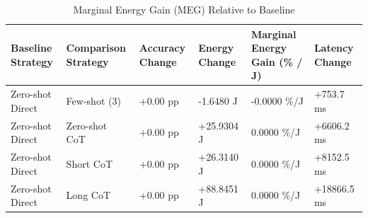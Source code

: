 \begin{table}
\caption{Marginal Energy Gain (MEG) Relative to Baseline}
\label{tab:marginal_energy_gain}
\begin{tabular}{llllll}
\toprule
Baseline Strategy & Comparison Strategy & Accuracy Change & Energy Change & Marginal Energy Gain (\% / J) & Latency Change \\
\midrule
Zero-shot Direct & Few-shot (3) & +0.00 pp & -1.6480 J & -0.0000 \%/J & +753.7 ms \\
Zero-shot Direct & Zero-shot CoT & +0.00 pp & +25.9304 J & 0.0000 \%/J & +6606.2 ms \\
Zero-shot Direct & Short CoT & +0.00 pp & +26.3140 J & 0.0000 \%/J & +8152.5 ms \\
Zero-shot Direct & Long CoT & +0.00 pp & +88.8451 J & 0.0000 \%/J & +18866.5 ms \\
\bottomrule
\end{tabular}
\end{table}
